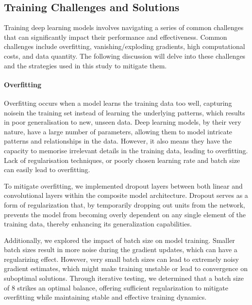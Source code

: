 \subsection{Training Challenges and Solutions}
\label{subsec:4_training_challenges_and_solutions}
Training deep learning models involves navigating a series of common challenges that can significantly impact their performance and effectiveness. Common challenges include overfitting, vanishing/exploding gradients, high computational costs, and data quantity. The following discussion will delve into these challenges and the strategies used in this study to mitigate them.

\paragraph*{Overfitting}
\label{par:4_overfitting}
Overfitting occurs when a model learns the training data too well, capturing noisein the training set instead of learning the underlying patterns, which results in poor generalisation to new, unseen data. Deep learning models, by their very nature, have a large number of parameters, allowing them to model intricate patterns and relationships in the data. However, it also means they have the capacity to memorise irrelevant details in the training data, leading to overfitting. Lack of regularisation techniques, or poorly chosen learning rate and batch size can easily lead to overfitting. 

To mitigate overfitting, we implemented dropout layers between both linear and convolutional layers within the composite model architecture. Dropout serves as a form of regularization that, by temporarily dropping out units from the network, prevents the model from becoming overly dependent on any single element of the training data, thereby enhancing its generalization capabilities.

Additionally, we explored the impact of batch size on model training. Smaller batch sizes result in more noise during the gradient updates, which can have a regularizing effect. However, very small batch sizes can lead to extremely noisy gradient estimates, which might make training unstable or lead to convergence on suboptimal solutions. Through iterative testing, we determined that a batch size of 8 strikes an optimal balance, offering sufficient regularization to mitigate overfitting while maintaining stable and effective training dynamics.

